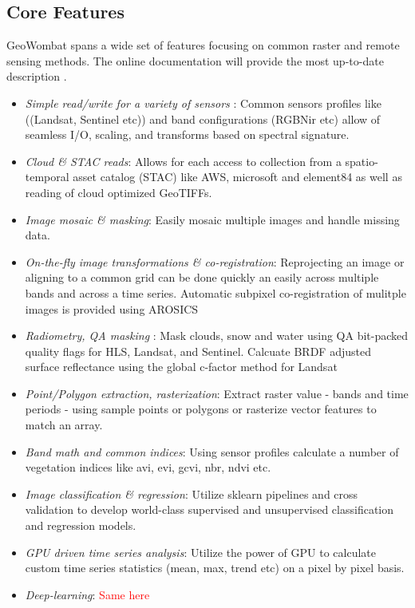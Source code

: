 \documentclass{jors}
\begin{document}
\subsection*{Core Features}
GeoWombat spans a wide set of features focusing on common raster and remote sensing methods. The online documentation will provide the most up-to-date description \cite{graesser_mann}.

\begin{itemize}
\item \textit{Simple read/write for a variety of sensors }: Common sensors profiles like ((Landsat, Sentinel etc)) and band configurations (RGBNir etc) allow of seamless I/O, scaling, and transforms based on spectral signature. 
\item \textit{Cloud \& STAC reads}: Allows for each access to  collection from a spatio-temporal asset catalog (STAC) like AWS, microsoft and element84 as well as reading of cloud optimized GeoTIFFs.  
\item \textit{Image mosaic \& masking}: Easily mosaic multiple images and handle missing data.   
\item \textit{On-the-fly image transformations \& co-registration}: Reprojecting an image or aligning to a common grid can be done quickly an easily across multiple bands and across a time series. Automatic subpixel co-registration  of mulitple images is provided using AROSICS 
\item \textit{Radiometry, QA masking }: Mask clouds, snow and water using QA bit-packed quality flags for HLS, Landsat, and Sentinel. Calcuate BRDF adjusted surface reflectance using the global c-factor method \cite{ROY2016255} for Landsat
\item \textit{Point/Polygon extraction, rasterization}: Extract raster value - bands and time periods - using sample points or polygons or rasterize vector features to match an array.  
\item \textit{Band math and common indices}: Using sensor profiles calculate a number of vegetation indices like avi, evi, gcvi, nbr, ndvi etc. 
\item \textit{Image classification \& regression}: Utilize sklearn pipelines and cross validation to develop world-class supervised and unsupervised classification and regression models. 
\item \textit{GPU driven time series analysis}: Utilize the power of GPU to calculate custom time series statistics (mean, max, trend etc) on a pixel by pixel basis.    
\item \textit{Deep-learning}:   \textcolor{red}{ Same here}

\end{itemize}
\end{document}
